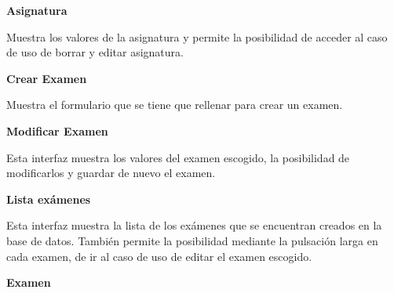 \textbf{Asignatura}

Muestra los valores de la asignatura y permite la posibilidad de acceder al caso de uso de borrar y editar asignatura.

\textbf{Crear Examen}

Muestra el formulario que se tiene que rellenar para crear un examen.

\textbf{Modificar Examen}

Esta interfaz muestra los valores del examen escogido, la posibilidad de modificarlos y guardar de nuevo el examen.

\textbf{Lista exámenes}

Esta interfaz muestra la lista de los exámenes que se encuentran creados en la base de datos.
También permite la posibilidad mediante la pulsación larga en cada examen, de ir al caso de uso de editar el examen escogido.

\textbf{Examen}


